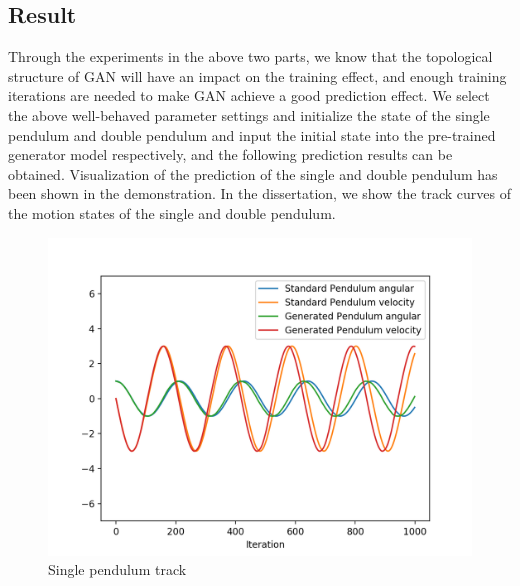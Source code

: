 \documentclass[11pt,a4paper]{article}
\begin{document}
\subsection{Result}
Through the experiments in the above two parts, we know that the topological structure of GAN will have an impact on the training effect, and enough training iterations are needed to make GAN achieve a good prediction effect. We select the above well-behaved parameter settings and initialize the state of the single pendulum and double pendulum and input the initial state into the pre-trained generator model respectively, and the following prediction results can be obtained. Visualization of the prediction of the single and double pendulum has been shown in the demonstration. In the dissertation, we show the track curves of the motion states of the single and double pendulum.
\\
\begin{figure}[h!]
\centering
\includegraphics[scale=0.6]{12.png}
\caption{Single pendulum track}
\label{fig:Single pendulum track}
\end{figure}
\end{document}
